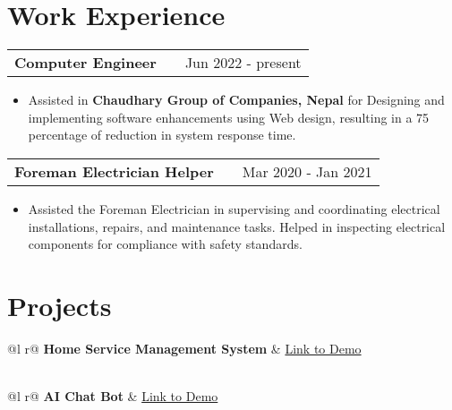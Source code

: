 \documentclass[a4paper,12pt]{article}
\makeatletter
\newenvironment{joblong}[2]
    {
    \begin{tabularx}{\linewidth}{@{}l X r@{}}
    \textbf{#1} & \hfill &  #2 \\[3.75pt]
    \end{tabularx}
    \begin{minipage}[t]{\linewidth}
    \begin{itemize}[nosep,after=\strut, leftmargin=1em, itemsep=3pt,label=--]
    }
    {
    \end{itemize}
    \end{minipage}    
    }
\makeatother
\begin{document}
\section{Work Experience}

\begin{joblong}{Computer Engineer}{Jun 2022 - present}
\item Assisted in \textbf{Chaudhary Group of Companies, Nepal} for Designing and implementing software enhancements using Web design, resulting in a 75 percentage of reduction in system response time.
\end{joblong}

\begin{joblong}{Foreman Electrician Helper}{Mar 2020 - Jan 2021}
\item Assisted the Foreman Electrician in supervising and coordinating electrical
installations, repairs, and maintenance tasks. Helped in inspecting electrical components for compliance with safety standards.
\end{joblong}
  
\section{Projects}

\begin{tabularx}{\linewidth}{ @{}l r@{} }
\textbf{Home Service Management System} & \hfill \href{https://kajbondu.web.app/}{Link to Demo} \\[3.75pt]
  \\
\end{tabularx}

\begin{tabularx}{\linewidth}{ @{}l r@{} }
\textbf{AI Chat Bot} & \hfill \href{https://jemini-bot.netlify.app/}{Link to Demo} \\[3.75pt]
  \\
\end{tabularx}
\end{document}

